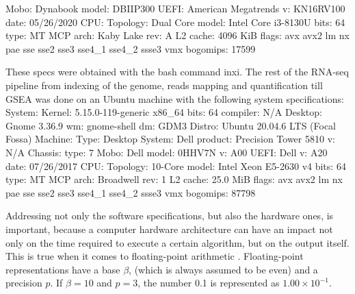 \documentclass[12pt]{article}
\begin{document}
           Mobo: Dynabook model: DBIIP300  
           UEFI: American Megatrends v: KN16RV100 
           date: 05/26/2020 
CPU:       
Topology: Dual Core model: Intel Core i3-8130U bits: 64 type: MT MCP arch: Kaby Lake 
           rev: A L2 cache: 4096 KiB 
           flags: avx avx2 lm nx pae sse sse2 sse3 sse4\_1 sse4\_2 ssse3 vmx bogomips: 17599 

These specs were obtained with the bash command inxi.
The rest of the RNA-seq pipeline from indexing of the genome, reads mapping and quantification till GSEA was done on an Ubuntu machine with the following system specifications:
System:
  Kernel: 5.15.0-119-generic x86\_64 bits: 64 compiler: N/A 
  Desktop: Gnome 3.36.9 wm: gnome-shell dm: GDM3 
  Distro: Ubuntu 20.04.6 LTS (Focal Fossa) 
Machine:
  Type: Desktop System: Dell product: Precision Tower 5810 v: N/A 
  Chassis: type: 7  
  Mobo: Dell model: 0HHV7N v: A00 
  UEFI: Dell v: A20 
  date: 07/26/2017 
CPU:
  Topology: 10-Core model: Intel Xeon E5-2630 v4 bits: 64 type: MT MCP 
  arch: Broadwell rev: 1 L2 cache: 25.0 MiB 
  flags: avx avx2 lm nx pae sse sse2 sse3 sse4\_1 sse4\_2 ssse3 vmx 
  bogomips: 87798 
  

\noindent Addressing not only the software specifications, but also the hardware ones, is important, because a computer hardware architecture can have an impact not only on the time required to execute a certain algorithm, but on the output itself. This is true when it comes to floating-point arithmetic \supercite{goldberg1991every}. Floating-point representations have a base $\beta$, (which is always assumed to be even) and a precision $p$. If $\beta=10$ and $p=3$, the number 0.1 is represented as $1.00\times10^{-1}$. 
\end{document}
